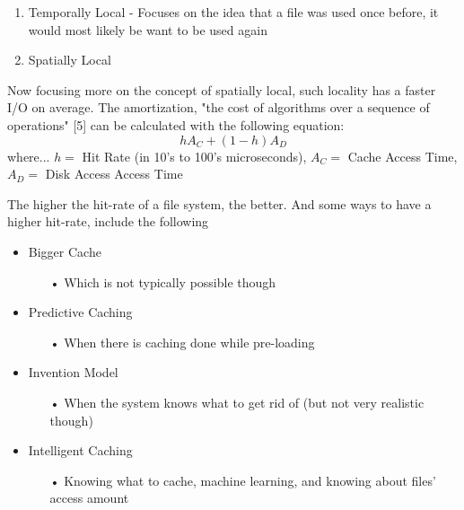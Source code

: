 \documentclass[letterpaper,10pt,onecolumn]{IEEEtran}
\begin{document}
\begin{enumerate}
	\item Temporally Local - Focuses on the idea that a file was used once before, it would most likely be want to be used again
	\item Spatially Local
\end{enumerate} 

Now focusing more on the concept of spatially local, such locality has a faster I/O on average. The amortization, "the cost of algorithms over a sequence of operations" [5] can be calculated with the following equation:
\[hA_C + (1 - h)A_D\]
where... \(h =\) Hit Rate (in 10's to 100's microseconds), \(A_C =\) Cache Access Time, \(A_D =\) Disk Access Access Time

\par \noindent
The higher the hit-rate of a file system, the better. And some ways to have a higher hit-rate, include the following 
\begin{itemize}
	\item Bigger Cache
		\begin{itemize}
			\item[•] Which is not typically possible though
		\end{itemize}
	\item Predictive Caching
		\begin{itemize}
			\item[•] When there is caching done while pre-loading
		\end{itemize}
	\item Invention Model
		\begin{itemize}
			\item[•] When the system knows what to get rid of (but not very realistic though)
		\end{itemize}
	\item Intelligent Caching
		\begin{itemize}
			\item[•] Knowing what to cache, machine learning, and knowing about files' access amount
		\end{itemize}
\end{itemize}
\end{document}
